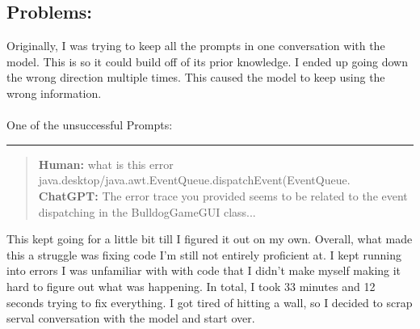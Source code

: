 \documentclass[a4paper,11pt]{article}
\begin{document}
\subsection*{Problems:}
Originally, I was trying to keep all the prompts in one conversation with the model. This is so it could build off of its prior knowledge. I ended up going down the wrong direction multiple times. This caused the model to keep using the wrong information.  \\\\
One of the unsuccessful Prompts:
\hrule
\vspace{4pt} %
\begin{quote}
\textbf{Human:} what is this error java.desktop/java.awt.EventQueue.dispatchEvent(EventQueue.\\
\textbf{ChatGPT:} The error trace you provided seems to be related to the event dispatching in the BulldogGameGUI class...
\end{quote}
This kept going for a little bit till I figured it out on my own. Overall, what made this a struggle was fixing code I'm still not entirely proficient at. I kept running into errors I was unfamiliar with with code that I didn't make myself making it hard to figure out what was happening. In total, I took 33 minutes and 12 seconds trying to fix everything. I got tired of hitting a wall, so I decided to scrap serval conversation with the model and start over. 
\end{document}
